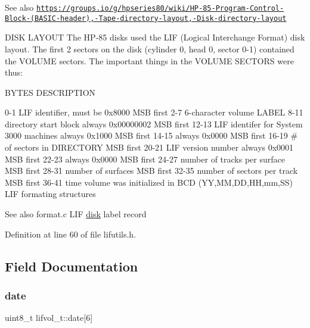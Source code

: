 \begin{DoxySeeAlso}{See also}
\href{https://groups.io/g/hpseries80/wiki/HP-85-Program-Control-Block-(BASIC-header),-Tape-directory-layout,-Disk-directory-layout}{\tt https\+://groups.\+io/g/hpseries80/wiki/\+H\+P-\/85-\/\+Program-\/\+Control-\/\+Block-\/(\+B\+A\+S\+I\+C-\/header),-\/\+Tape-\/directory-\/layout,-\/\+Disk-\/directory-\/layout}
\end{DoxySeeAlso}
D\+I\+SK L\+A\+Y\+O\+UT The H\+P-\/85 disks used the L\+IF (Logical Interchange Format) disk layout. The first 2 sectors on the disk (cylinder 0, head 0, sector 0-\/1) contained the V\+O\+L\+U\+ME sectors. The important things in the V\+O\+L\+U\+ME S\+E\+C\+T\+O\+RS were thus\+:

B\+Y\+T\+ES D\+E\+S\+C\+R\+I\+P\+T\+I\+ON 

 0-\/1 L\+IF identifier, must be 0x8000 M\+SB first 2-\/7 6-\/character volume L\+A\+B\+EL 8-\/11 directory start block always 0x00000002 M\+SB first 12-\/13 L\+IF identifer for System 3000 machines always 0x1000 M\+SB first 14-\/15 always 0x0000 M\+SB first 16-\/19 \# of sectors in D\+I\+R\+E\+C\+T\+O\+RY M\+SB first 20-\/21 L\+IF version number always 0x0001 M\+SB first 22-\/23 always 0x0000 M\+SB first 24-\/27 number of tracks per surface M\+SB first 28-\/31 number of surfaces M\+SB first 32-\/35 number of sectors per track M\+SB first 36-\/41 time volume was initialized in B\+CD (YY,MM,DD,HH,mm,SS) L\+IF formating structures \begin{DoxySeeAlso}{See also}
format.\+c L\+IF \hyperlink{td02lif_8c_affcceda12b139f26819f4929be705eb1}{disk} label record 
\end{DoxySeeAlso}


Definition at line 60 of file lifutils.\+h.



\subsection{Field Documentation}
\mbox{\label{structlifvol__t_a41f630e7211326270dc6e72a55f94516}} 
\subsubsection{\texorpdfstring{date}{date}}
{\footnotesize\ttfamily uint8\+\_\+t lifvol\+\_\+t\+::date\mbox{[}6\mbox{]}}



